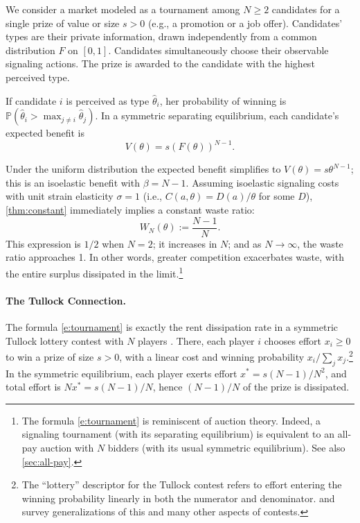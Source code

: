 \documentclass[12 pt]{article}
\theoremstyle{remark}
\theoremstyle{definition}
\newcommand{\Prob}{\mathbb{P}}
\let\oldfootnote\footnote
\renewcommand\footnote[1]{\oldfootnote{\hspace{.5mm}#1}}
\begin{document}
We consider a market modeled as a tournament among $N\geq 2$ candidates for a single prize of value or size $s>0$ (e.g., a promotion or a job offer).  Candidates' types are their private information, drawn independently from a common distribution $F$ on $[0,1]$. Candidates simultaneously choose their observable signaling actions. The prize is awarded to the candidate with the highest perceived type.

If candidate $i$ is perceived as type $\hat\theta_i$, her probability of winning is $\Prob(\hat\theta_i > \max_{j \neq i} \hat\theta_j)$. In a symmetric separating equilibrium, each candidate's expected benefit is
\[
V(\theta) = s \left(F(\theta)\right)^{N-1}.
\]

Under the uniform distribution the expected benefit simplifies to $V(\theta) = s \theta^{N-1}$; this is an isoelastic benefit with $\beta = N-1$.  Assuming isoelastic signaling costs with unit strain elasticity $\sigma=1$ (i.e., $C(a,\theta)=D(a)/\theta$ for some $D$), \autoref{thm:constant} immediately implies a constant waste ratio:
\begin{equation}\label{e:tournament}
W_N(\theta) := \frac{N-1}{N}.
\end{equation}
This expression is $1/2$ when $N=2$; it increases in $N$; and as $N \to \infty$, the waste ratio approaches 1. In other words, greater competition exacerbates waste, with the entire surplus dissipated in the limit.\footnote{The formula \eqref{e:tournament} is reminiscent of auction theory. Indeed, a signaling tournament (with its separating equilibrium) is equivalent to an all-pay auction with $N$ bidders (with its usual symmetric equilibrium). See also \autoref{sec:all-pay}.}

\paragraph{The Tullock Connection.} 
The formula \eqref{e:tournament} is exactly the rent dissipation rate in a symmetric Tullock lottery contest with $N$ players \citep{Tullock80}. %
There, each player $i$ chooses effort $x_i \geq 0$ to win a prize of size $s>0$, with a linear cost and winning probability $x_i / \sum_j x_j$.\footnote{The ``lottery'' descriptor for the Tullock contest refers to effort entering the winning probability linearly in both the numerator and denominator. \citet{Nitzan94} and \citet{Corchon07} survey generalizations of this and many other aspects of contests.} In the symmetric equilibrium, each player exerts effort $x^* = s(N-1)/N^2$, and total effort is $Nx^*=s(N-1)/N$, hence $(N-1)/N$ of the prize is dissipated.
\end{document}
